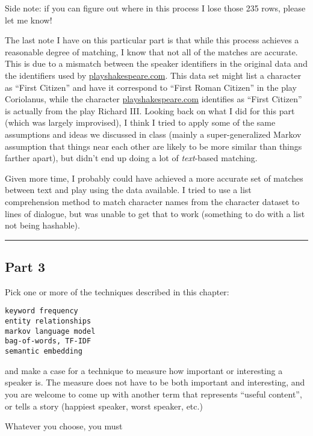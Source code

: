 \documentclass[11pt]{article}
\begin{document}
Side note: if you can figure out where in this process I lose those 235
rows, please let me know!

The last note I have on this particular part is that while this process
achieves a reasonable degree of matching, I know that not all of the
matches are accurate. This is due to a mismatch between the speaker
identifiers in the original data and the identifiers used by
\url{playshakespeare.com}. This data set might list a character as
``First Citizen'' and have it correspond to ``First Roman Citizen'' in
the play Coriolanus, while the character \url{playshakespeare.com}
identifies as ``First Citizen'' is actually from the play Richard III.
Looking back on what I did for this part (which was largely improvised),
I think I tried to apply some of the same assumptions and ideas we
discussed in class (mainly a super-generalized Markov assumption that
things near each other are likely to be more similar than things farther
apart), but didn't end up doing a lot of \emph{text}-based matching.

Given more time, I probably could have achieved a more accurate set of
matches between text and play using the data available. I tried to use a
list comprehension method to match character names from the character
dataset to lines of dialogue, but was unable to get that to work
(something to do with a list not being hashable).

    \begin{center}\rule{0.5\linewidth}{0.5pt}\end{center}

\hypertarget{part-3}{%
\subsection{Part 3}\label{part-3}}

Pick one or more of the techniques described in this chapter:

\begin{verbatim}
keyword frequency
entity relationships
markov language model
bag-of-words, TF-IDF
semantic embedding
\end{verbatim}

and make a case for a technique to measure how important or interesting
a speaker is. The measure does not have to be both important and
interesting, and you are welcome to come up with another term that
represents ``useful content'', or tells a story (happiest speaker, worst
speaker, etc.)

Whatever you choose, you must
\end{document}
